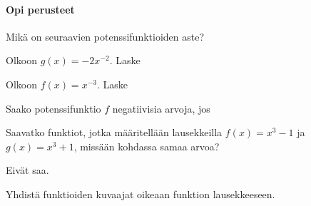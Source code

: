 \begin{tehtavasivu}

\paragraph*{Opi perusteet}

\begin{tehtava}
Mikä on seuraavien potenssifunktioiden aste?
\begin{vastaus}
\end{vastaus}
\end{tehtava}

\begin{tehtava}
Olkoon $g(x)=-2x^{-2}$. Laske
\begin{vastaus}
\end{vastaus}
\end{tehtava}

\begin{tehtava}
Olkoon $f(x)=x^{-3}$. Laske
\begin{vastaus}
\end{vastaus}
\end{tehtava}

\begin{tehtava}
Saako potenssifunktio $f$ negatiivisia arvoja, jos
\begin{vastaus}
\end{vastaus}
\end{tehtava}

\begin{tehtava}
Saavatko funktiot, jotka määritellään lausekkeilla $f(x)=x^3-1$ ja $g(x)=x^3+1$, missään kohdassa samaa arvoa?
\begin{vastaus}
Eivät saa.
\end{vastaus}
\end{tehtava}

\begin{tehtava}
Yhdistä funktioiden kuvaajat oikeaan funktion lausekkeeseen.


\end{tehtava}
\end{tehtavasivu}
